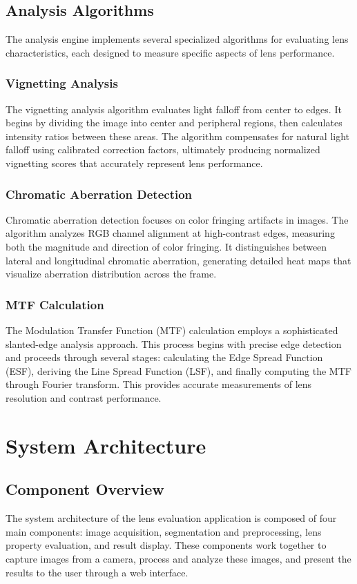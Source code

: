 \subsection{Analysis Algorithms}
The analysis engine implements several specialized algorithms for evaluating lens characteristics, each designed to measure specific aspects of lens performance.

\subsubsection{Vignetting Analysis}
The vignetting analysis algorithm evaluates light falloff from center to edges. It begins by dividing the image into center and peripheral regions, then calculates intensity ratios between these areas. The algorithm compensates for natural light falloff using calibrated correction factors, ultimately producing normalized vignetting scores that accurately represent lens performance.

\subsubsection{Chromatic Aberration Detection}
Chromatic aberration detection focuses on color fringing artifacts in images. The algorithm analyzes RGB channel alignment at high-contrast edges, measuring both the magnitude and direction of color fringing. It distinguishes between lateral and longitudinal chromatic aberration, generating detailed heat maps that visualize aberration distribution across the frame.

\subsubsection{MTF Calculation}
The Modulation Transfer Function (MTF) calculation employs a sophisticated slanted-edge analysis approach. This process begins with precise edge detection and proceeds through several stages: calculating the Edge Spread Function (ESF), deriving the Line Spread Function (LSF), and finally computing the MTF through Fourier transform. This provides accurate measurements of lens resolution and contrast performance.


\section{System Architecture}

\subsection{Component Overview}
The system architecture of the lens evaluation application is composed of four main components: image acquisition, segmentation and preprocessing, lens property evaluation, and result display. These components work together to capture images from a camera, process and analyze these images, and present the results to the user through a web interface.

